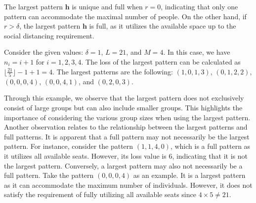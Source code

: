 The largest pattern $\bm{h}$ is unique and full when $r = 0$, indicating that only one pattern can accommodate the maximal number of people. On the other hand, if $r > \delta$, the largest pattern $\bm{h}$ is full, as it utilizes the available space up to the social distancing requirement.



\begin{example}
Consider the given values: $\delta = 1$, $L = 21$, and $M = 4$. In this case, we have $n_i = i + 1$ for $i = 1, 2, 3, 4$. The loss of the largest pattern can be calculated as $\lfloor \frac{21}{5} \rfloor - 1 + 1 = 4$. The largest patterns are the following: $(1, 0, 1, 3)$, $(0, 1, 2, 2)$, $(0, 0, 0, 4)$, $(0, 0, 4, 1)$, and $(0, 2, 0, 3)$. 
\end{example}


Through this example, we observe that the largest pattern does not exclusively consist of large groups but can also include smaller groups. This highlights the importance of considering the various group sizes when using the largest pattern. Another observation relates to the relationship between the largest patterns and full patterns. It is apparent that a full pattern may not necessarily be the largest pattern. For instance, consider the pattern $(1, 1, 4, 0)$, which is a full pattern as it utilizes all available seats. However, its loss value is 6, indicating that it is not the largest pattern. Conversely, a largest pattern may also not necessarily be a full pattern. Take the pattern $(0, 0, 0, 4)$ as an example. It is a largest pattern as it can accommodate the maximum number of individuals. However, it does not satisfy the requirement of fully utilizing all available seats since $4 \times 5 \neq 21$.

